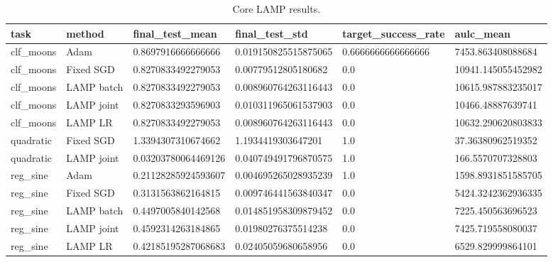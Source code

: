 \begin{table}[t]
\centering
\begin{tabular}{llllll}
\toprule
task & method & final\_test\_mean & final\_test\_std & target\_success\_rate & aulc\_mean \\ \midrule
clf\_moons & Adam & 0.8697916666666666 & 0.019150825515875065 & 0.6666666666666666 & 7453.863408088684 \\
clf\_moons & Fixed SGD & 0.8270833492279053 & 0.00779512805180682 & 0.0 & 10941.145055452982 \\
clf\_moons & LAMP batch & 0.8270833492279053 & 0.008960764263116443 & 0.0 & 10615.987883235017 \\
clf\_moons & LAMP joint & 0.8270833293596903 & 0.010311965061537903 & 0.0 & 10466.48887639741 \\
clf\_moons & LAMP LR & 0.8270833492279053 & 0.008960764263116443 & 0.0 & 10632.290620803833 \\
quadratic & Fixed SGD & 1.3394307310674662 & 1.1934419303647201 & 1.0 & 37.36380962519352 \\
quadratic & LAMP joint & 0.03203780064469126 & 0.040749491796870575 & 1.0 & 166.5570707328803 \\
reg\_sine & Adam & 0.21128285924593607 & 0.004695265028935239 & 1.0 & 1598.8931851585705 \\
reg\_sine & Fixed SGD & 0.3131563862164815 & 0.009746441563840347 & 0.0 & 5424.3242362936335 \\
reg\_sine & LAMP batch & 0.4497005840142568 & 0.014851958309879452 & 0.0 & 7225.450563696523 \\
reg\_sine & LAMP joint & 0.4592314263184865 & 0.01980276375514238 & 0.0 & 7425.719558080037 \\
reg\_sine & LAMP LR & 0.42185195287068683 & 0.02405059680658956 & 0.0 & 6529.829999864101 \\
\bottomrule
\end{tabular}
\caption{Core LAMP results.}
\end{table}
